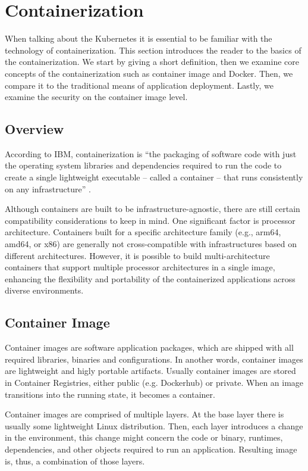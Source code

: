 \section{Containerization}

When talking about the Kubernetes it is essential to be familiar with the technology of containerization. This section introduces the reader to the basics of the containerization. We start by giving a short definition, then we examine core concepts of the containerization such as container image and Docker. Then, we compare it to the traditional means of application deployment. Lastly, we examine the security on the container image level.

\subsection{Overview}

According to IBM, containerization is ``the packaging of software code with just the operating system libraries and dependencies required to run the code to create a single lightweight executable -- called a container -- that runs consistently on any infrastructure'' \cite{ibm-containerization}.

Although containers are built to be infrastructure-agnostic, there are still certain compatibility considerations to keep in mind. One significant factor is processor architecture. Containers built for a specific architecture family (e.g., arm64, amd64, or x86) are generally not cross-compatible with infrastructures based on different architectures. However, it is possible to build multi-architecture containers that support multiple processor architectures in a single image, enhancing the flexibility and portability of the containerized applications across diverse environments.

\subsection{Container Image}

Container images are software application packages, which are shipped with all required libraries, binaries and configurations. In another words, container images are lightweight and higly portable artifacts. Usually container images are stored in Container Registries, either public (e.g. Dockerhub) or private. When an image transitions into the running state, it becomes a container.

Container images are comprised of multiple layers. At the base layer there is usually some lightweight Linux distribution. Then, each layer introduces a change in the environment, this change might concern the code or binary, runtimes, dependencies, and other objects required to run an application. Resulting image is, thus, a combination of those layers.

